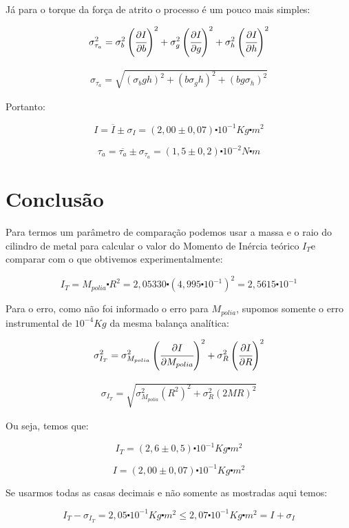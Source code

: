 \documentclass[a4paper]{article}
\begin{document}
Já para o torque da força de atrito o processo é um pouco mais simples:


$$\sigma_{\tau_{a}}^{2}=\sigma_{b}^{2}\left(\cfrac[r]{\partial I}{\partial b}\right)^{2}+\sigma_{g}^{2}\left(\cfrac[r]{\partial I}{\partial g}\right)^{2}+\sigma_{h}^{2}\left(\cfrac[r]{\partial I}{\partial h}\right)^{2}$$

\begin{align}
\sigma_{\tau_{a}}=\sqrt{(\sigma_{b}gh)^{2}+(b\sigma_{g}h)^{2}+(bg\sigma_{h})^{2}}
\end{align}

Portanto:

$$I=\overline{I}\pm\sigma_{I}=(2,00\pm0,07)\centerdot10^{-1}Kg\centerdot m^{2}$$

$$\tau_{a}=\overline{\tau_{a}}\pm\sigma_{\tau_{a}}=(1,5\pm0,2)\centerdot10^{-2}N\centerdot m$$

\section{Conclusão}

Para termos um parâmetro de comparação podemos usar a massa e o raio do cilindro de metal para calcular o valor do Momento de Inércia teórico
$I_{T}$e comparar com o que obtivemos experimentalmente:

$$I_{T}=M_{polia}\centerdot R^{2}=2,05330\centerdot(4,995\centerdot10^{-1})^{2}=2,5615\centerdot10^{-1}$$

Para o erro, como não foi informado o erro para $M_{polia}$, supomos somente o erro instrumental de $10^{-4}$$Kg$ da mesma balança analítica:

$$
\sigma_{I_{T}}^{2}=\sigma_{M_{polia}}^{2}\left(\cfrac{\partial I}{\partial M_{polia}}\right)^{2}+\sigma_{R}^{2}\left(\cfrac{\partial I}{\partial R}\right)^{2}
$$

\begin{align}
\sigma_{I_{T}}=\sqrt{\sigma_{M_{polia}}^{2}\left(R^{2}\right)^{2}+\sigma_{R}^{2}\left(2MR\right)^{2}}
\end{align}

Ou seja, temos que:

$$I_{T}=(2,6\pm0,5)\centerdot10^{-1}Kg\centerdot m^{2}$$

$$I=(2,00\pm0,07)\centerdot10^{-1}Kg\centerdot m^{2}$$

Se usarmos todas as casas decimais e não somente as mostradas aqui temos:

$$
I_{T}-\sigma_{I_{T}}=2,05\centerdot10^{-1}Kg\centerdot m^{2}\leq2,07\centerdot10^{-1}Kg\centerdot m^{2}=I+\sigma_{I}
$$
\end{document}
